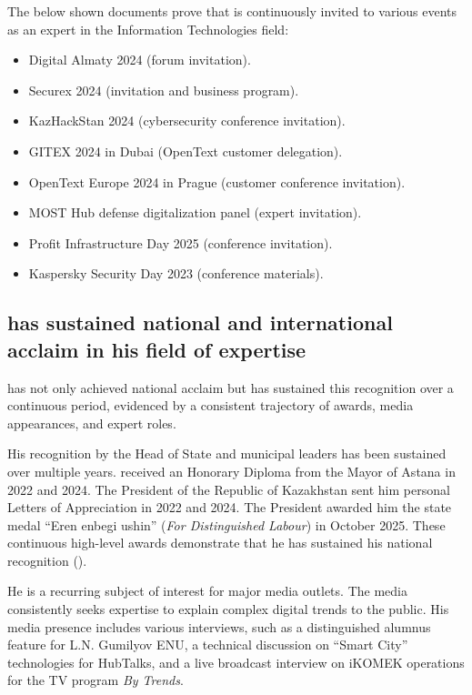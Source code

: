 The below shown documents prove that \mrl{} is continuously invited to various events as an expert in the Information Technologies field:
\begin{itemize}
\item Digital Almaty 2024 (forum invitation). 
\item Securex 2024 (invitation and business program).  
\item KazHackStan 2024 (cybersecurity conference invitation). 
\item GITEX 2024 in Dubai (OpenText customer delegation). 
\item OpenText Europe 2024 in Prague (customer conference invitation). 
\item MOST Hub defense digitalization panel (expert invitation). 
\item Profit Infrastructure Day 2025 (conference invitation). 
\item Kaspersky Security Day 2023 (conference materials). 
\end{itemize}

\subsection{\mrl{} has sustained national and international acclaim in his field of expertise}

\label{subsec:SustainedAcclaim}

\mrl{} has not only achieved national acclaim but has sustained this recognition over a continuous period, evidenced by a consistent trajectory of awards, media appearances, and expert roles.

His recognition by the Head of State and municipal leaders has been sustained over multiple years. \mrl{} received an Honorary Diploma from the Mayor of Astana in 2022 and 2024. The President of the Republic of Kazakhstan sent him personal Letters of Appreciation in 2022 and 2024. The President awarded him the state medal ``Eren enbegi ushin'' (\emph{For Distinguished Labour}) in October 2025. These continuous high-level awards demonstrate that he has sustained his national recognition ().

He is a recurring subject of interest for major media outlets. The media consistently seeks \mrls expertise to explain complex digital trends to the public. His media presence includes various interviews, such as a distinguished alumnus feature for L.N. Gumilyov ENU, a technical discussion on ``Smart City'' technologies for HubTalks, and a live broadcast interview on iKOMEK operations for the TV program \emph{By Trends}.

